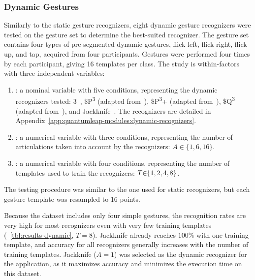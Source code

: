 \subsubsection{Dynamic Gestures}
Similarly to the static gesture recognizers, eight dynamic gesture recognizers were tested on the \lui gesture set to determine the best-suited recognizer. The gesture set contains four types of pre-segmented dynamic gestures, \ie \textsf{flick left}, \textsf{flick right}, \textsf{flick up}, and \textsf{tap}, acquired from four participants. Gestures were performed four times by each participant, giving 16 templates per class. The study is within-factors with three independent variables: 
\begin{enumerate}
    \item {}: a nominal variable with five conditions, representing the dynamic recognizers tested:  3\textcent~\cite{Caputo:2017}, \$P\textsuperscript{3} (adapted from~\cite{Vatavu:2012}), \$P\textsuperscript{3}+ (adapted from~\cite{Vatavu:2017a}), \$Q\textsuperscript{3} (adapted from~\cite{Vatavu:2018}), and Jackknife~\cite{Taranta:2017}. The recognizers are detailed in Appendix~\ref{app:quantumleap-modules:dynamic-recognizers}.
    \item {}: a numerical variable with three conditions, representing the number of articulations taken into account by the recognizers: $A{\in}\{1, 6, 16\}$.
    \item {}: a numerical variable with four conditions, representing the number of templates used to train the recognizers: $\splitatcommas{T{\in}\{1,2,4,8\}}$.
\end{enumerate}
The testing procedure was similar to the one used for static recognizers, but each gesture template was resampled to 16 points.

Because the dataset includes only four simple gestures, the recognition rates are very high for most recognizers even with very few training templates (\tab~\ref{tbl:results-dynamic}, $T{=}8$). Jackknife already reaches $100\%$ with one training template, and accuracy for all recognizers generally increases with the number of training templates. %
Jackknife ($A{=}1$) was selected as the dynamic recognizer for the \lui application, as it maximizes accuracy and minimizes the execution time on this dataset.

